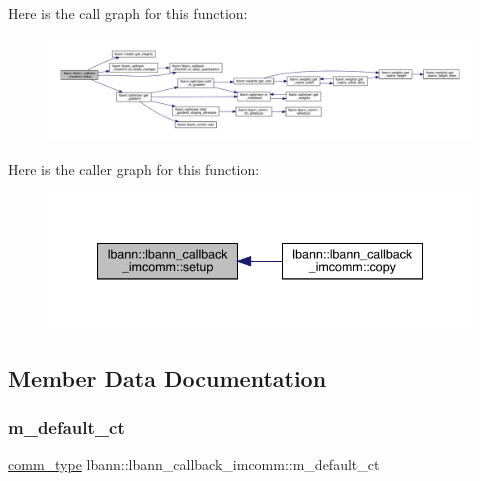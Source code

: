 Here is the call graph for this function\+:\nopagebreak
\begin{figure}[H]
\begin{center}
\leavevmode
\includegraphics[width=350pt]{classlbann_1_1lbann__callback__imcomm_a096555a87ce1bb011ceafb44081c4192_cgraph}
\end{center}
\end{figure}
Here is the caller graph for this function\+:\nopagebreak
\begin{figure}[H]
\begin{center}
\leavevmode
\includegraphics[width=340pt]{classlbann_1_1lbann__callback__imcomm_a096555a87ce1bb011ceafb44081c4192_icgraph}
\end{center}
\end{figure}


\subsection{Member Data Documentation}
\mbox{\label{classlbann_1_1lbann__callback__imcomm_ac3df687b12721a7278877c303357bc09}} 
\subsubsection{\texorpdfstring{m\+\_\+default\+\_\+ct}{m\_default\_ct}}
{\footnotesize\ttfamily \hyperlink{classlbann_1_1lbann__callback__imcomm_acf7e894b3381e7f9b71020dc73594d6a}{comm\+\_\+type} lbann\+::lbann\+\_\+callback\+\_\+imcomm\+::m\+\_\+default\+\_\+ct\hspace{0.3cm}{\ttfamily [private]}}

